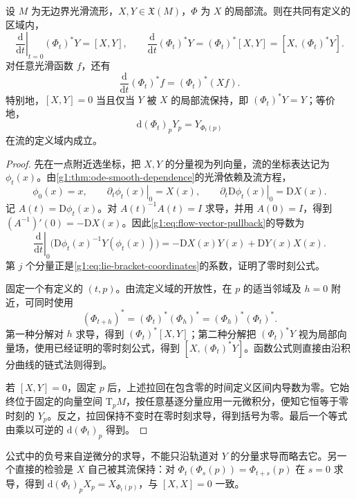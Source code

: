 \begin{proposition}
	\label{g1:prop:flow-pullback-derivative}
	设 \(M\) 为无边界光滑流形，\(X,Y\in\mathfrak X(M)\)，\(\Phi\) 为 \(X\) 的局部流。则在共同有定义的区域内，
	\[
		\left.\frac{\mathrm{d}}{\mathrm{d}t}\right|_{t=0}(\Phi_t)^*Y=[X,Y],
		\qquad
		\frac{\mathrm{d}}{\mathrm{d}t}(\Phi_t)^*Y
		=(\Phi_t)^*[X,Y]=[X,(\Phi_t)^*Y].
	\]
	对任意光滑函数 \(f\)，还有
	\[
		\frac{\mathrm{d}}{\mathrm{d}t}(\Phi_t)^*f=(\Phi_t)^*(Xf).
	\]
	特别地，\([X,Y]=0\) 当且仅当 \(Y\) 被 \(X\) 的局部流保持，即 \((\Phi_t)^*Y=Y\)；等价地，
	\[
		\mathrm{d}(\Phi_t)_pY_p=Y_{\Phi_t(p)}
	\]
	在流的定义域内成立。
\end{proposition}
\begin{proof}
	先在一点附近选坐标，把 \(X,Y\) 的分量视为列向量，流的坐标表达记为 \(\phi_t(x)\)。由\cref{g1:thm:ode-smooth-dependence}的光滑依赖及流方程，
	\[
		\phi_0(x)=x,\qquad
		\left.\partial_t\phi_t(x)\right|_0=X(x),\qquad
		\left.\partial_t\mathrm{D}\phi_t(x)\right|_0=\mathrm{D}X(x).
	\]
	记 \(A(t)=\mathrm{D}\phi_t(x)\)。对 \(A(t)^{-1}A(t)=I\) 求导，并用 \(A(0)=I\)，得到 \((A^{-1})'(0)=-\mathrm{D}X(x)\)。因此\eqref{g1:eq:flow-vector-pullback}的导数为
	\[
		\left.\frac{\mathrm{d}}{\mathrm{d}t}\right|_0
		\bigl(\mathrm{D}\phi_t(x)^{-1}Y(\phi_t(x))\bigr)
		=-\mathrm{D}X(x)Y(x)+\mathrm{D}Y(x)X(x).
	\]
	第 \(j\) 个分量正是\eqref{g1:eq:lie-bracket-coordinates}的系数，证明了零时刻公式。

	固定一个有定义的 \((t,p)\)。由流定义域的开放性，在 \(p\) 的适当邻域及 \(h=0\) 附近，可同时使用
	\[
		(\Phi_{t+h})^*=(\Phi_t)^*(\Phi_h)^*
		=(\Phi_h)^*(\Phi_t)^*.
	\]
	第一种分解对 \(h\) 求导，得到 \((\Phi_t)^*[X,Y]\)；第二种分解把 \((\Phi_t)^*Y\) 视为局部向量场，使用已经证明的零时刻公式，得到 \([X,(\Phi_t)^*Y]\)。函数公式则直接由沿积分曲线的链式法则得到。

	若 \([X,Y]=0\)，固定 \(p\) 后，上述拉回在包含零的时间定义区间内导数为零。它始终位于固定的向量空间 \(\mathrm{T}_pM\)，按任意基逐分量应用一元微积分，便知它恒等于零时刻的 \(Y_p\)。反之，拉回保持不变时在零时刻求导，得到括号为零。最后一个等式由乘以可逆的 \(\mathrm{d}(\Phi_t)_p\) 得到。
\end{proof}

公式中的负号来自逆微分的求导，不能只沿轨道对 \(Y\) 的分量求导而略去它。另一个直接的检验是 \(X\) 自己被其流保持：对 \(\Phi_t(\Phi_s(p))=\Phi_{t+s}(p)\) 在 \(s=0\) 求导，得到 \(\mathrm{d}(\Phi_t)_pX_p=X_{\Phi_t(p)}\)，与 \([X,X]=0\) 一致。

